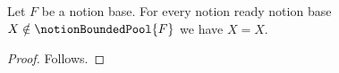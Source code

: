 

\begin{proposition}\label{notion_negative_bound_cannot_supply_guard}
    Let $F$ be a notion base.
    For every notion ready notion base $X\notin\notionBoundedPool{F}$ we have $X=X$.
\end{proposition}
\begin{proof}
    Follows.
\end{proof}
